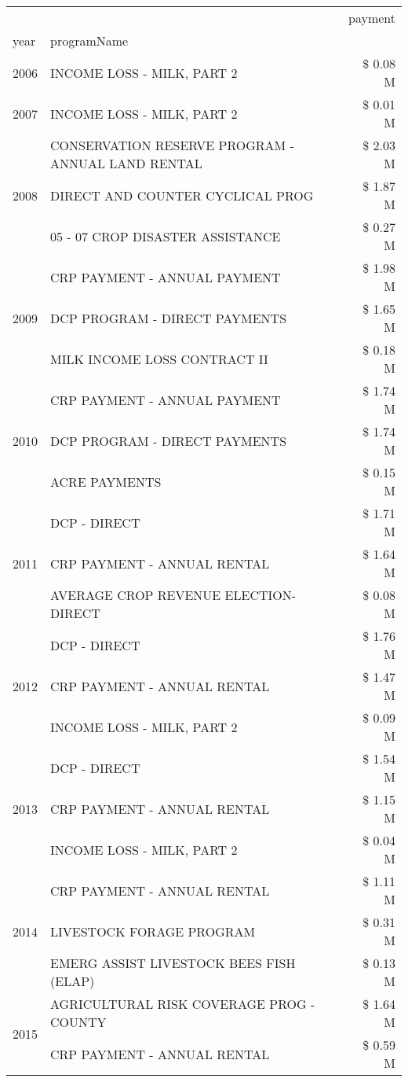 \begin{tabular}{llr}
\toprule
 &  & payment \\
year & programName &  \\
\midrule
2006 & INCOME LOSS - MILK, PART 2 & \$ 0.08 M \\
\cline{1-3}
2007 & INCOME LOSS - MILK, PART 2 & \$ 0.01 M \\
\cline{1-3}
\multirow[t]{3}{*}{2008} & CONSERVATION RESERVE PROGRAM - ANNUAL LAND RENTAL & \$ 2.03 M \\
 & DIRECT AND COUNTER CYCLICAL PROG & \$ 1.87 M \\
 & 05 - 07 CROP DISASTER ASSISTANCE & \$ 0.27 M \\
\cline{1-3}
\multirow[t]{3}{*}{2009} & CRP PAYMENT - ANNUAL PAYMENT & \$ 1.98 M \\
 & DCP PROGRAM - DIRECT PAYMENTS & \$ 1.65 M \\
 & MILK INCOME LOSS CONTRACT II & \$ 0.18 M \\
\cline{1-3}
\multirow[t]{3}{*}{2010} & CRP PAYMENT - ANNUAL PAYMENT & \$ 1.74 M \\
 & DCP PROGRAM - DIRECT PAYMENTS & \$ 1.74 M \\
 & ACRE PAYMENTS & \$ 0.15 M \\
\cline{1-3}
\multirow[t]{3}{*}{2011} & DCP - DIRECT & \$ 1.71 M \\
 & CRP PAYMENT - ANNUAL RENTAL & \$ 1.64 M \\
 & AVERAGE CROP REVENUE ELECTION-DIRECT & \$ 0.08 M \\
\cline{1-3}
\multirow[t]{3}{*}{2012} & DCP - DIRECT & \$ 1.76 M \\
 & CRP PAYMENT - ANNUAL RENTAL & \$ 1.47 M \\
 & INCOME LOSS - MILK, PART 2 & \$ 0.09 M \\
\cline{1-3}
\multirow[t]{3}{*}{2013} & DCP - DIRECT & \$ 1.54 M \\
 & CRP PAYMENT - ANNUAL RENTAL & \$ 1.15 M \\
 & INCOME LOSS - MILK, PART 2 & \$ 0.04 M \\
\cline{1-3}
\multirow[t]{3}{*}{2014} & CRP PAYMENT - ANNUAL RENTAL & \$ 1.11 M \\
 & LIVESTOCK FORAGE PROGRAM & \$ 0.31 M \\
 & EMERG ASSIST LIVESTOCK BEES FISH (ELAP) & \$ 0.13 M \\
\cline{1-3}
\multirow[t]{3}{*}{2015} & AGRICULTURAL RISK COVERAGE PROG - COUNTY & \$ 1.64 M \\
 & CRP PAYMENT - ANNUAL RENTAL & \$ 0.59 M \\

\end{tabular}
